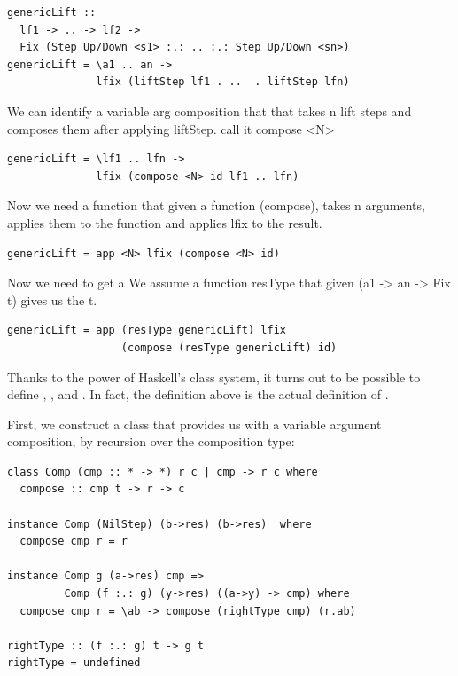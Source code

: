\documentclass[preprint,natbib]{sigplanconf}
\begin{document}
\begin{small}
\begin{verbatim}
genericLift :: 
  lf1 -> .. -> lf2 ->
  Fix (Step Up/Down <s1> :.: .. :.: Step Up/Down <sn>)
genericLift = \a1 .. an -> 
              lfix (liftStep lf1 . ..  . liftStep lfn)
\end{verbatim}%
\end{small}

We can identify a variable arg composition that that takes n lift steps and composes them after applying liftStep. call it compose <N> 

\begin{small}
\begin{verbatim}
genericLift = \lf1 .. lfn -> 
              lfix (compose <N> id lf1 .. lfn)
\end{verbatim}%
\end{small}

Now we need a function that given a function (compose), takes n arguments, applies them to the function and applies lfix to the result.

\begin{small}
\begin{verbatim}
genericLift = app <N> lfix (compose <N> id)
\end{verbatim}%
\end{small}

Now we need to get a 
We assume a function resType that given (a1 -> an -> Fix t) gives us the t.

\begin{small}
\begin{verbatim}
genericLift = app (resType genericLift) lfix 
                  (compose (resType genericLift) id)
\end{verbatim}%
\end{small}

Thanks to the power of Haskell's class system, it turns out to be possible to define , , and . In fact, the definition above is the actual definition of . 

First, we construct a class  that provides us with a variable argument composition, by recursion over the composition type:

\begin{small}
\begin{verbatim}
class Comp (cmp :: * -> *) r c | cmp -> r c where
  compose :: cmp t -> r -> c

instance Comp (NilStep) (b->res) (b->res)  where
  compose cmp r = r  

instance Comp g (a->res) cmp =>
         Comp (f :.: g) (y->res) ((a->y) -> cmp) where
  compose cmp r = \ab -> compose (rightType cmp) (r.ab)

rightType :: (f :.: g) t -> g t
rightType = undefined
\end{verbatim}
\end{small}
\end{document}
